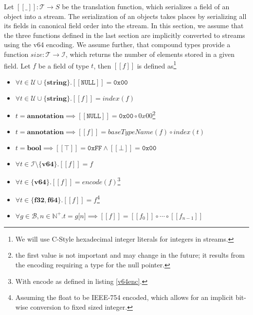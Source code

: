 \documentclass[a4paper,10pt]{article}
\newcommand{\den}[1]{\ensuremath{[\![#1]\!]}}
\begin{document}
Let $\den{\_}:\mathcal{T} → S$ be the translation function, which serializes a field of an object into a stream. The serialization of an objects takes places by serializing all its fields in canonical field order into the stream. In this section, we assume that the three functions defined in the last section are implicitly converted to streams using the v64 encoding. We assume further, that compound types provide a function $size: \mathcal{T} → \mathcal{I}$, which returns the number of elements stored in a given field.
Let $f$ be a field of type $t$, then $\den{f}$ is defined as\footnote{We will use C-Style hexadecimal integer literals for integers in streams.}
\begin{itemize}
 \item $\forall t \in \mathcal{U}\cup\{\textbf{string}\}. \den{\texttt{NULL}} = \texttt{0x00}$
 \item $\forall t \in \mathcal{U}\cup\{\textbf{string}\}. \den{f} = index(f)$
 
 \item $t=\textbf{annotation} \implies \den{\texttt{NULL}} = \texttt{0x00} \circ 0x00$\footnote{the first value is not important and may change in the future; it results from the encoding requiring a type for the null pointer.}
 \item $t=\textbf{annotation} \implies \den{f} = baseTypeName(f) \circ index(t)$
 
 \item $t=\textbf{bool} \implies \den{\top} = \texttt{0xFF} \wedge \den{\bot} = \texttt{0x00}$
 
 \item $\forall t \in \mathcal{I}\setminus\{\textbf{v64}\}. \den{f} = f$
 
 \item $\forall t \in \{\textbf{v64}\}. \den{f} = encode(f)$\footnote{With encode as defined in listing \ref{v64enc}.}
 
 \item $\forall t \in \{\textbf{f32},\textbf{f64}\}. \den{f} = f$\footnote{Assuming the float to be IEEE-754 encoded, which allows for an implicit bit-wise conversion to fixed sized integer.}
 
 \item $\forall g \in \mathcal{B}, n \in \mathbb{N}^+. t = g\texttt{[}n\texttt{]} \implies \den{f} = \den{f_0} \circ \cdots \circ \den{f_{n-1}}$
 

\end{itemize}
\end{document}
